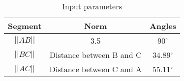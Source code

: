 \begin{table}[h!]
\centering
\begin{tabular}{|c|c|c|}
\hline
	\textbf{Segment} & \textbf{Norm} & \textbf{Angles}\\ \hline
	\( ||AB|| \) & 3.5 & 90$^\circ$\\ \hline
	\( ||BC|| \) & Distance between B and C & 34.89$^\circ$\\ \hline
	\( ||AC|| \) & Distance between C and A & 55.11$^\circ$\\ \hline
\end{tabular}
\caption{Input parameters}
\end{table}
